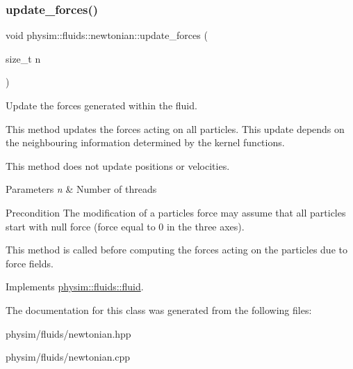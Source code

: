 \subsubsection{\texorpdfstring{update\+\_\+forces()}{update\_forces()}\hspace{0.1cm}{\footnotesize\ttfamily [2/2]}}
{\footnotesize\ttfamily void physim\+::fluids\+::newtonian\+::update\+\_\+forces (\begin{DoxyParamCaption}\item[{size\+\_\+t}]{n }\end{DoxyParamCaption})\hspace{0.3cm}{\ttfamily [virtual]}}



Update the forces generated within the fluid. 

This method updates the forces acting on all particles. This update depends on the neighbouring information determined by the kernel functions.

This method does not update positions or velocities.


\begin{DoxyParams}{Parameters}
{\em n} & Number of threads \\
\hline
\end{DoxyParams}
\begin{DoxyPrecond}{Precondition}
The modification of a particles\textquotesingle{} force may assume that all particles start with null force (force equal to 0 in the three axes). 

This method is called before computing the forces acting on the particles due to force fields. 
\end{DoxyPrecond}


Implements \hyperlink{classphysim_1_1fluids_1_1fluid_a08fe6b6111608b3deb3c3ddd84e1ab32}{physim\+::fluids\+::fluid}.



The documentation for this class was generated from the following files\+:\begin{DoxyCompactItemize}
\item 
physim/fluids/newtonian.\+hpp\item 
physim/fluids/newtonian.\+cpp\end{DoxyCompactItemize}
